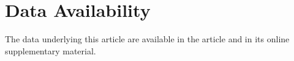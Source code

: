 \documentclass[twocolumn]{aastex631}
\begin{document}
\section*{Data Availability}
The data underlying this article are available in the article and in its online supplementary material.






\end{document}
